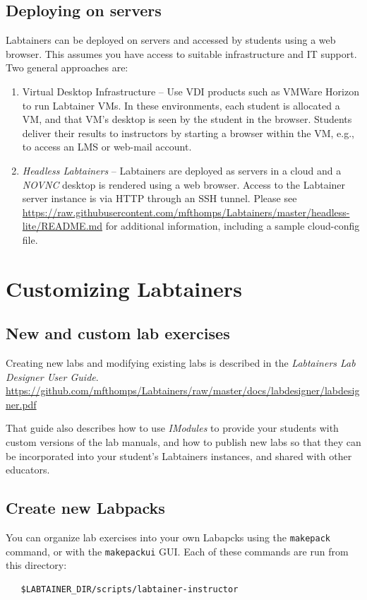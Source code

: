 \documentclass[12pt]{article}
\begin{document}
\subsection{Deploying on servers}
\label{servers}
Labtainers can be deployed on servers and accessed by students using a web browser.  This assumes you have
access to suitable infrastructure and IT support.  Two general approaches are:
\begin{enumerate}
\item Virtual Desktop Infrastructure -- Use VDI products such as VMWare Horizon 
to run Labtainer VMs. In these environments, each student is allocated a VM, and that VM's desktop is seen 
by the student in the browser.  Students deliver their results to instructors by starting a browser
within the VM, e.g., to access an LMS or web-mail account.
\item \textit{Headless Labtainers} -- Labtainers are deployed as servers in a cloud and a \textit{NOVNC} desktop is 
rendered using a web browser.  Access to the Labtainer server instance is via HTTP through an SSH tunnel.
Please see \url{https://raw.githubusercontent.com/mfthomps/Labtainers/master/headless-lite/README.md} for additional information,
including a sample cloud-config file.
\end{enumerate}

\section{Customizing Labtainers}
\label{customizing}
\subsection{New and custom lab exercises}
Creating new labs and modifying existing labs is described in the \textit{Labtainers Lab Designer User Guide}.
\url{https://github.com/mfthomps/Labtainers/raw/master/docs/labdesigner/labdesigner.pdf}

That guide also describes how to use \textit{IModules} to provide your students with custom versions of the lab manuals, and how to
publish new labs so that they can be incorporated into your student's Labtainers instances, and shared
with other educators.

\subsection{Create new Labpacks}
You can organize lab exercises into your own Labapcks using the {\tt makepack} command, or with the {\tt makepackui} GUI.  
Each of these commands are run from this directory:
\begin{verbatim}
   $LABTAINER_DIR/scripts/labtainer-instructor
\end{verbatim}
\end{document}
